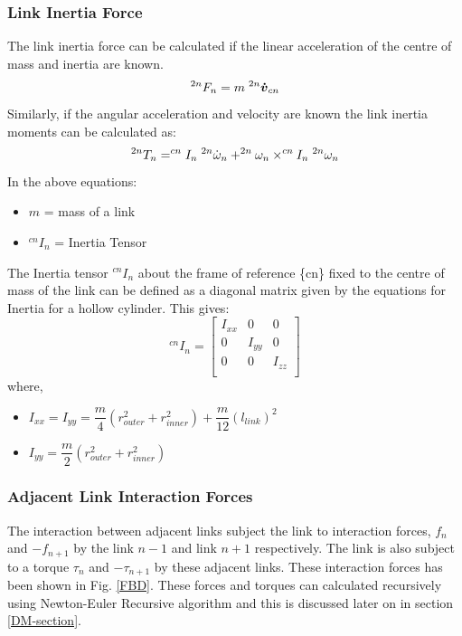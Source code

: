 \documentclass[a4paper,12pt]{report}
\begin{document}
\subsubsection{Link Inertia Force}
The link inertia force can be calculated if the linear acceleration of the centre of mass and inertia are known. 
\begin{equation}
\label{LIF}
^{2n}F_{n}=m\hspace{1mm} ^{2n}\boldsymbol{\dot{v}}_{cn}
\end{equation}
Similarly, if the angular acceleration and velocity are known the link inertia moments can be calculated as:
\begin{equation}
\label{LIM}
^{2n}T_{n} = ^{cn}I_{n}\hspace{1mm} ^{2n}\dot{\omega}_{n} + ^{2n}\omega_{n} \times ^{cn}I_{n}\hspace{1mm} ^{2n}\omega_{n}
\end{equation}
In the above equations:
\begin{itemize}
	\renewcommand\labelitemi{--}
	\item $m$ = mass of a link
	\item $^{cn}I_{n}$ = Inertia Tensor
\end{itemize}
The Inertia tensor $^{cn}I_{n}$ about the frame of reference \{cn\} fixed to the centre of mass of the link can be defined as a diagonal matrix given by the equations for Inertia for a hollow cylinder. This gives:
\begin{equation}
^{cn}I_{n} = 
\begin{bmatrix}
I_{xx} & 0 & 0 \\
0 & I_{yy} & 0 \\
0 & 0 & I_{zz} \\
\end{bmatrix}
\end{equation}
where,
\begin{itemize}
	\renewcommand\labelitemi{--}
	\item $I_{xx}= I_{yy}= \dfrac{m}{4}({r_{outer}^2}+{r_{inner}^2}) + \dfrac{m}{12}(l_{link})^2$
	\item $I_{yy}=\dfrac{m}{2}({r_{outer}^2}+{r_{inner}^2})$
\end{itemize}
\subsubsection{Adjacent Link Interaction Forces}
The interaction between adjacent links subject the link to interaction forces, $f_n$ and $-f_{n+1}$ by the link $n-1$ and link $n+1$ respectively. The link is also subject to a torque $\tau_n$ and $-\tau_{n+1}$ by these adjacent links. These interaction forces has been shown in Fig. \ref{FBD}. These forces and torques can calculated recursively using Newton-Euler Recursive algorithm and this is discussed later on in section \ref{DM-section}.
\end{document}
